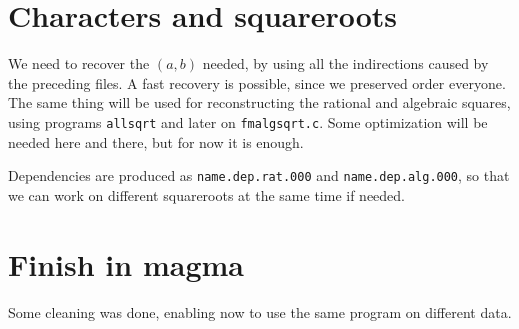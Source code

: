 \documentclass{article}
\begin{document}
\section{Characters and squareroots}

We need to recover the $(a, b)$ needed, by using all the indirections
caused by the preceding files. A fast recovery is possible, since we
preserved order everyone. The same thing will be used for
reconstructing the rational and algebraic squares, using programs
\verb+allsqrt+ and later on \verb+fmalgsqrt.c+. Some optimization will
be needed here and there, but for now it is enough. 

Dependencies are produced as \verb+name.dep.rat.000+ and
\verb+name.dep.alg.000+, so that we can work on different squareroots
at the same time if needed.

\section{Finish in magma}

Some cleaning was done, enabling now to use the same program on
different data.

\iffalse
\section{Deprecated stuff}

\subsection{procrels}

That is a very naive program whose aim is to get rid of singletons,
being either $5$ or a large prime (convenient, after all?).

It is naive in the way it is programmed: first build a big table of
all primes occurring in relations, then sort it, then crunch it to get
rid of duplicates!!!! No hashing is performed.

This program cannot be used as the basis of the filtering step, so
that everything has to be written from scratch!

All the relations are to fit in core memory!!

Programming leads to potentially very slow computations, since many
operations are done slowly.
\fi
\end{document}
